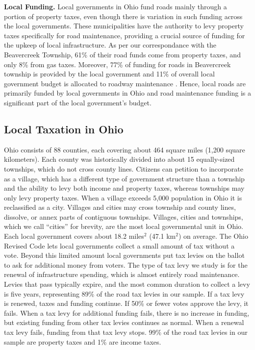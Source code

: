 {\bf Local Funding.} Local governments in Ohio fund roads mainly through a portion of property taxes, even though there is variation in such funding across the local governments. These municipalities have the authority to levy property taxes specifically for road maintenance, providing a crucial source of funding for the upkeep of local infrastructure. As per our correspondance with the Beavercreek Township, 61\% of their road funds come from property taxes, and only 8\% from gas taxes. Moreover, 77\% of funding for roads in Beavercreek township is provided by the local government and 11\% of overall local government budget is allocated to roadway maintenance \citep{schroeder2025}. Hence, local roads are primarily funded by local governments in Ohio and road maintenance funding is a significant part of the local government's budget.


\subsection{Local Taxation in Ohio}

Ohio consists of 88 counties, each covering about 464 square miles (1,200 square kilometers).  Each county was historically divided into about 15 equally-sized townships, which do not cross county lines.  Citizens can petition to incorporate as a village, which has a different type of government structure than a township and the ability to levy both income and property taxes, whereas townships may only levy property taxes.  When a village exceeds 5,000 population in Ohio it is reclassified as a city.  Villages and cities may cross township and county lines, dissolve, or annex parts of contiguous townships.  Villages, cities and townships, which we call “cities” for brevity, are the most local governmental unit in Ohio. Each local government covers about 18.2 miles$^2$ (47.1 km$^2$) on average. The Ohio Revised Code lets local governments collect a small amount of tax without a vote.  Beyond this limited amount local governments put tax levies on the ballot to ask for additional money from voters.  
The type of tax levy we study is for the renewal of infrastructure spending, which is almost entirely road maintenance.  Levies that pass typically expire, and the most common duration to collect a levy is five years, representing 89\% of the road tax levies in our sample.  If a tax levy is renewed, taxes and funding continue.  If 50\% or fewer votes approve the levy, it fails.  When a tax levy for additional funding fails, there is no increase in funding, but existing funding from other tax levies continues as normal.  When a renewal tax levy fails, funding from that tax levy stops.  99\% of the road tax levies in our sample are property taxes and 1\% are income taxes.

